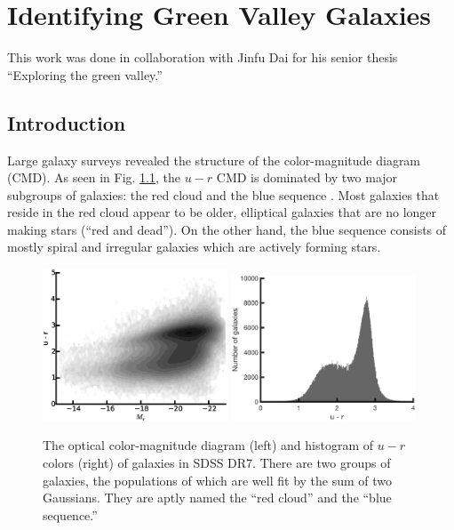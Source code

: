 \chapter[Green Valley Galaxies]{Identifying Green Valley Galaxies}\label{ch:GV}

This work was done in collaboration with Jinfu Dai for his senior thesis 
``Exploring the green valley.''


\section{Introduction}

Large galaxy surveys \citep[like the Sloan Digital Sky Survey;][]{York00} 
revealed the structure of the color-magnitude diagram (CMD).  As seen in Fig. 
\ref{fig:ur_CMD}, the $u-r$ CMD is dominated by two major subgroups of galaxies: 
the red cloud and the blue sequence \citep{Strateva01, Baldry04}.  Most galaxies 
that reside in the red cloud appear to be older, elliptical galaxies that are no 
longer making stars (``red and dead'').  On the other hand, the blue sequence 
consists of mostly spiral and irregular galaxies which are actively forming stars.

\begin{figure}
    \includegraphics[width=0.49\textwidth]{Images/GV/ur_CMD_contour}
    \includegraphics[width=0.49\textwidth]{Images/GV/ur_hist}
    \caption[Optical color-magnitude diagram and histogram of $u-r$ in SDSS]{The 
    optical color-magnitude diagram (left) and histogram of $u-r$ colors (right) 
    of galaxies in SDSS DR7.  There are two groups of galaxies, the populations 
    of which are well fit by the sum of two Gaussians.  They are aptly named the 
    ``red cloud'' and the ``blue sequence.''}
    \label{fig:ur_CMD}
\end{figure}

